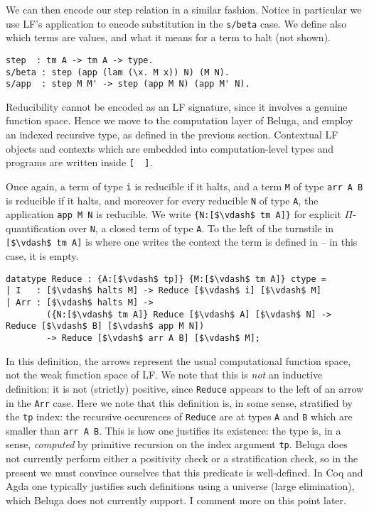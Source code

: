 \documentclass{article}
\begin{document}
We can then encode our step relation in a similar fashion. Notice in
particular we use LF's application to encode substitution in the
\lstinline{s/beta} case. We define also which terms are values, and
what it means for a term to halt (not shown). 

\begin{lstlisting}
step  : tm A -> tm A -> type.
s/beta : step (app (lam (\x. M x)) N) (M N).
s/app  : step M M' -> step (app M N) (app M' N).
\end{lstlisting}

Reducibility cannot be encoded as an LF signature, since it
involves a genuine function space. Hence we move to the
computation layer of Beluga, and employ an
indexed recursive type, as defined in the previous section. Contextual LF objects
and contexts which are embedded into computation-level types and programs are 
written inside \lstinline![  ]!. 

Once again, a term of type \lstinline{i} is reducible if it halts, and a term
\lstinline{M} of
type \lstinline{arr A B} is reducible if it halts, and moreover for every
reducible \lstinline{N} of type \lstinline{A}, the application
\lstinline{app M N} is reducible. We write \lstinline!{N:[$\vdash$ tm A]}!
for explicit $\Pi$-quantification over \lstinline{N}, a closed term of type
\lstinline!A!. To the left of the turnstile in \lstinline{[$\vdash$ tm A]} is where
one writes the context the term is defined in -- in this case, it is empty.

\begin{lstlisting}
datatype Reduce : {A:[$\vdash$ tp]} {M:[$\vdash$ tm A]} ctype =
| I   : [$\vdash$ halts M] -> Reduce [$\vdash$ i] [$\vdash$ M]
| Arr : [$\vdash$ halts M] ->
        ({N:[$\vdash$ tm A]} Reduce [$\vdash$ A] [$\vdash$ N] -> Reduce [$\vdash$ B] [$\vdash$ app M N])
        -> Reduce [$\vdash$ arr A B] [$\vdash$ M];
\end{lstlisting}

In this definition, the arrows represent the usual computational
function space, not the weak function space of LF. We note that this
is \emph{not} an inductive definition: it is not (strictly) positive, since \lstinline{Reduce}
appears to the left of an arrow in the \lstinline{Arr} case. Here we note that this
definition is, in some sense, stratified by the \lstinline{tp} index: the recursive occurences of
\lstinline{Reduce} are at types \lstinline{A} and \lstinline{B} which
are smaller than \lstinline{arr A B}. This is how one justifies its
existence: the type is, in a sense, \emph{computed} by primitive
recursion on the index argument \lstinline{tp}. Beluga does not currently perform either a positivity check
or a stratification check, so in the present we must convince ourselves that this
predicate is well-defined. In Coq \citep{bertot/casteran:2004} and Agda
\citep{Norell:phd07} one typically justifies such definitions using a
universe (large elimination), which Beluga does not currently
support. I comment more on this point later.
\end{document}
